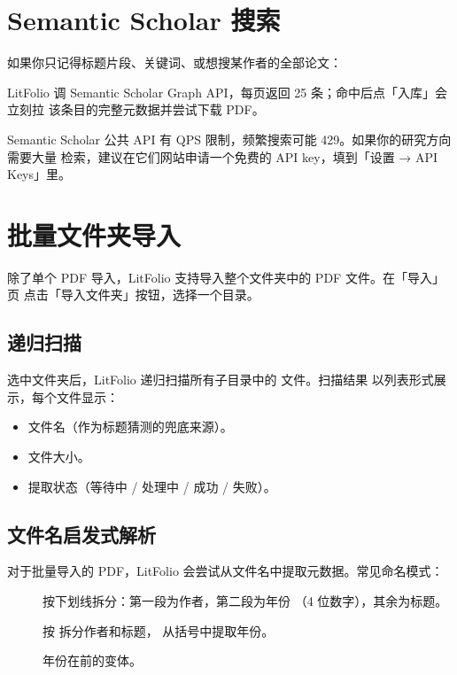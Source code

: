 \section{Semantic Scholar 搜索}

如果你只记得标题片段、关键词、或想搜某作者的全部论文：


LitFolio 调 Semantic Scholar Graph API，每页返回 25 条；命中后点「入库」会立刻拉
该条目的完整元数据并尝试下载 PDF。

\begin{warnbox}
Semantic Scholar 公共 API 有 QPS 限制，频繁搜索可能 429。如果你的研究方向需要大量
检索，建议在它们网站申请一个免费的 API key，填到「设置 → API Keys」里。
\end{warnbox}

\section{批量文件夹导入}

除了单个 PDF 导入，LitFolio 支持导入整个文件夹中的 PDF 文件。在「导入」页
点击「导入文件夹」按钮，选择一个目录。

\subsection{递归扫描}

选中文件夹后，LitFolio 递归扫描所有子目录中的  文件。扫描结果
以列表形式展示，每个文件显示：

\begin{itemize}
  \item 文件名（作为标题猜测的兜底来源）。
  \item 文件大小。
  \item 提取状态（等待中 / 处理中 / 成功 / 失败）。
\end{itemize}

\subsection{文件名启发式解析}

对于批量导入的 PDF，LitFolio 会尝试从文件名中提取元数据。常见命名模式：

\begin{description}
  \item[] 按下划线拆分：第一段为作者，第二段为年份
    （4 位数字），其余为标题。
  \item[] 按 \cmd{ - } 拆分作者和标题，
    从括号中提取年份。
  \item[] 年份在前的变体。
\end{description}

